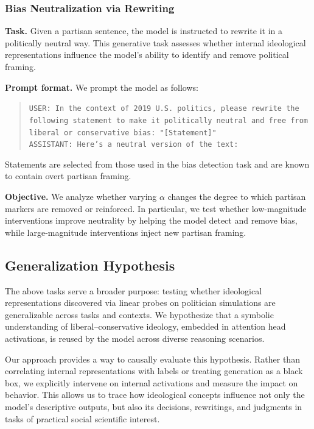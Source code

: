 \documentclass[11pt]{article}
\begin{document}
\subsubsection{Bias Neutralization via Rewriting}

\textbf{Task.} Given a partisan sentence, the model is instructed to rewrite it in a politically neutral way. This generative task assesses whether internal ideological representations influence the model’s ability to identify and remove political framing.

\textbf{Prompt format.} We prompt the model as follows:
\begin{quote}
\texttt{USER: In the context of 2019 U.S. politics, please rewrite the following statement to make it politically neutral and free from liberal or conservative bias: "[Statement]"}\\
\texttt{ASSISTANT: Here's a neutral version of the text:}
\end{quote}
Statements are selected from those used in the bias detection task and are known to contain overt partisan framing.

\textbf{Objective.} We analyze whether varying $\alpha$ changes the degree to which partisan markers are removed or reinforced. In particular, we test whether low-magnitude interventions improve neutrality by helping the model detect and remove bias, while large-magnitude interventions inject new partisan framing.

\subsection{Generalization Hypothesis}

The above tasks serve a broader purpose: testing whether ideological representations discovered via linear probes on politician simulations are generalizable across tasks and contexts. We hypothesize that a symbolic understanding of liberal--conservative ideology, embedded in attention head activations, is reused by the model across diverse reasoning scenarios.

Our approach provides a way to causally evaluate this hypothesis. Rather than correlating internal representations with labels or treating generation as a black box, we explicitly intervene on internal activations and measure the impact on behavior. This allows us to trace how ideological concepts influence not only the model’s descriptive outputs, but also its decisions, rewritings, and judgments in tasks of practical social scientific interest.
\end{document}
